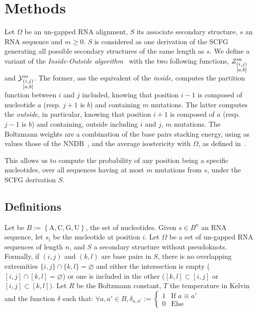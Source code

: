 \section{Methods}
\label{sec:methods}
Let $\Omega$ be an un-gapped RNA alignment, $S$ its associate secondary structure, $s$ an RNA 
sequence and $m\geq 0$. $S$ is considered as  one derivation of the SCFG generating  
all possible secondary structures of the same length as $s$. We define a variant of the
 \emph{Inside-Outside algorithm}~\cite{Lari1990} with the two following functions,
$\Z{i,j}{m}{a,b}$ and $\Y{i,j}{m}{a,b}$. The former, ass the 
equivalent of the \emph{inside}, computes the partition function between $i$ and $j$ included, 
knowing that position $i-1$ is composed of nucleotide $a$ (resp. $j+1$ is $b$) and containing $m$ mutations. The latter computes the \emph{outside}, in particular, knowing 
that position $i+1$ is composed of $a$ (resp. $j-1$ is $b$) and containing, outside 
including $i$ and $j$, $m$ mutations.
The Boltzmann weights are a combination of the base pairs stacking energy, 
using as values those of the NNDB~\cite{Turner2010}, and
the average isostericity with $\Omega$, as defined in~\cite{Stombaugh2009}. 

This allows us to compute the probability of any position being a specific nucleotides,
over all sequences having at most $m$ mutations from $s$, under the SCFG derivation $S$.

\subsection{Definitions}
Let be $B:=\left\{\text{A},\text{C},\text{G},\text{U}\right\}$, the set of nucleotides.
Given $s\in B^n$ an RNA sequence, let $s_i$ be the nucleotide at position $i$. Let $\Omega$ be a set of un-gapped RNA sequences of
length $n$, and $S$ a secondary structure without pseudoknots. 
Formally, if $(i,j)$ and $(k,l)$ are base pairs in $S$, there is no overlapping extremities
 $\{i,j\}\cap \{k,l\}=\varnothing$ and either the intersection is empty 
 ($[i,j]\cap[k,l]=\varnothing$) or one is included in the other ($[k,l]\subset[i,j]$ or 
 $[i,j]\subset[k,l])$. Let $R$ be the Boltzmann constant, $T$ the temperature in Kelvin and
  the function $\delta$ such that: 
 $\forall a,a' \in B, \delta_{a,a'}:=\left\{\begin{array}{ll}
															1 & \text{If } a\equiv a'\\
															0 & \text{Else}
														\end{array}\right.$

